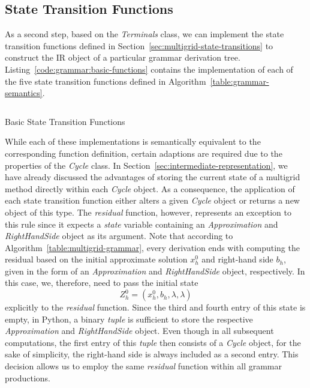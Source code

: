 \subsection{State Transition Functions}
\label{sec:evostencils:state-transition-functions}
As a second step, based on the \emph{Terminals} class, we can implement the state transition functions defined in Section~\ref{sec:multigrid-state-transitions} to construct the IR object of a particular grammar derivation tree.
Listing~\ref{code:grammar:basic-functions} contains the implementation of each of the five state transition functions defined in Algorithm~\ref{table:grammar-semantics}.
\begin{listing}
	\inputminted{python}{evostencils/grammar/base.py}
	\caption{Basic State Transition Functions}
	\label{code:grammar:basic-functions}
\end{listing}
While each of these implementations is semantically equivalent to the corresponding function definition, certain adaptions are required due to the properties of the \emph{Cycle} class.
In Section~\ref{sec:intermediate-representation}, we have already discussed the advantages of storing the current state of a multigrid method directly within each \emph{Cycle} object.
As a consequence, the application of each state transition function either alters a given \emph{Cycle} object or returns a new object of this type.
The \emph{residual} function, however, represents an exception to this rule since it expects a \emph{state} variable containing an \emph{Approximation} and \emph{RightHandSide} object as its argument.
Note that according to Algorithm~\ref{table:multigrid-grammar}, every derivation ends with computing the residual based on the initial approximate solution $x_h^0$ and right-hand side $b_h$, given in the form of an \emph{Approximation} and \emph{RightHandSide} object, respectively.
In this case, we, therefore, need to pass the initial state 
\begin{equation*}
	Z_h^0 = (x_h^0, b_h, \lambda, \lambda)
\end{equation*} explicitly to the \emph{residual} function.
Since the third and fourth entry of this state is empty, in Python, a binary \emph{tuple} is sufficient to store the respective \emph{Approximation} and \emph{RightHandSide} object.
Even though in all subsequent computations, the first entry of this \emph{tuple} then consists of a \emph{Cycle} object, for the sake of simplicity, the right-hand side is always included as a second entry.
This decision allows us to employ the same \emph{residual} function within all grammar productions.
